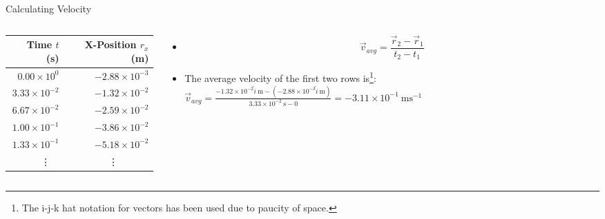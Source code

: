 \documentclass{beamer}
\begin{document}
\begin{frame}{Calculating Velocity}
\begin{columns}
\begin{column}{0.5\textwidth}
   \begin{center}
   \begin{tabular}{|r|r|}
   \hline
   \textbf{Time} \(t\) (s) & \textbf{X-Position} \(r_x\) (m) \\
   \hline
   \(0.00\times 10^0\) & \(-2.88\times 10^{-3}\) \\
   \hline
   \(3.33\times 10^{-2}\) & \(-1.32\times 10^{-2}\) \\
   \hline
   \(6.67\times 10^{-2}\) & \(-2.59\times 10^{-2}\) \\
	\hline
	\(1.00\times 10^{-1}\) & \(-3.86\times 10^{-2}\) \\
	\hline
	\(1.33\times 10^{-1}\) & \(-5.18\times 10^{-2}\) \\
	\hline
	\multicolumn{2}{|c|}{\vdots\ \ \ \ \ \ \ \ \ \ \ \ \vdots} \\
	\hline
   \end{tabular}
   \end{center}
\end{column}
\begin{column}{0.5\textwidth}
	\begin{itemize}
		\item \[\vec{v}_{avg} = \frac{\vec{r}_2-\vec{r}_1}
				{t_2-t_1}\]
		\item The average velocity of the first two rows is\footnote{The i-j-k hat 
				notation for vectors has been used due to paucity of space.}:
				\(\vec{v}_{avg} = \frac{-1.32\times 10^{-2}\hat{i}\ \mathrm{m}-(-2.88\times 10^{-3}\hat{i}\ \mathrm{m})}
				{3.33\times 10^{-2}\ \mathrm{s}-0} = -3.11\times 10^{-1}\ \mathrm{ms^{-1}}\)
	\end{itemize}
\end{column}
\end{columns}
\end{frame}
\end{document}
